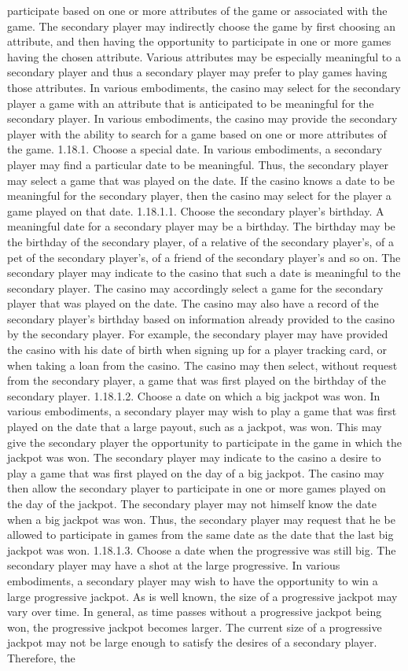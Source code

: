 \documentclass[11pt,a4paper]{article}
\begin{document}
participate based on one or more attributes of the game or associated with the game. The secondary player may indirectly choose the game by first choosing an attribute, and then having the opportunity to participate in one or more games having the chosen attribute. Various attributes may be especially meaningful to a secondary player and thus a secondary player may prefer to play games having those attributes. In various embodiments, the casino may select for the secondary player a game with an attribute that is anticipated to be meaningful for the secondary player. In various embodiments, the casino may provide the secondary player with the ability to search for a game based on one or more attributes of the game. 1.18.1. Choose a special date. In various embodiments, a secondary player may find a particular date to be meaningful. Thus, the secondary player may select a game that was played on the date. If the casino knows a date to be meaningful for the secondary player, then the casino may select for the player a game played on that date. 1.18.1.1. Choose the secondary player's birthday. A meaningful date for a secondary player may be a birthday. The birthday may be the birthday of the secondary player, of a relative of the secondary player's, of a pet of the secondary player's, of a friend of the secondary player's and so on. The secondary player may indicate to the casino that such a date is meaningful to the secondary player. The casino may accordingly select a game for the secondary player that was played on the date. The casino may also have a record of the secondary player's birthday based on information already provided to the casino by the secondary player. For example, the secondary player may have provided the casino with his date of birth when signing up for a player tracking card, or when taking a loan from the casino. The casino may then select, without request from the secondary player, a game that was first played on the birthday of the secondary player. 1.18.1.2. Choose a date on which a big jackpot was won. In various embodiments, a secondary player may wish to play a game that was first played on the date that a large payout, such as a jackpot, was won. This may give the secondary player the opportunity to participate in the game in which the jackpot was won. The secondary player may indicate to the casino a desire to play a game that was first played on the day of a big jackpot. The casino may then allow the secondary player to participate in one or more games played on the day of the jackpot. The secondary player may not himself know the date when a big jackpot was won. Thus, the secondary player may request that he be allowed to participate in games from the same date as the date that the last big jackpot was won. 1.18.1.3. Choose a date when the progressive was still big. The secondary player may have a shot at the large progressive. In various embodiments, a secondary player may wish to have the opportunity to win a large progressive jackpot. As is well known, the size of a progressive jackpot may vary over time. In general, as time passes without a progressive jackpot being won, the progressive jackpot becomes larger. The current size of a progressive jackpot may not be large enough to satisfy the desires of a secondary player. Therefore, the 
\end{document}
